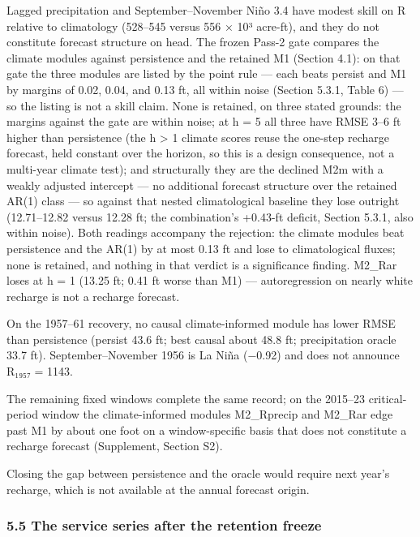 \documentclass[11pt]{article}
\begin{document}
Lagged precipitation and September--November Niño 3.4 have modest skill
on R relative to climatology (528--545 versus 556 × 10³ acre-ft), and
they do not constitute forecast structure on head. The frozen Pass-2
gate compares the climate modules against persistence and the retained
M1 (Section 4.1): on that gate the three modules are listed by the point
rule --- each beats persist and M1 by margins of 0.02, 0.04, and 0.13
ft, all within noise (Section 5.3.1, Table 6) --- so the listing is not
a skill claim. None is retained, on three stated grounds: the margins
against the gate are within noise; at h = 5 all three have RMSE 3--6 ft
higher than persistence (the h \textgreater{} 1 climate scores reuse the
one-step recharge forecast, held constant over the horizon, so this is a
design consequence, not a multi-year climate test); and structurally
they are the declined M2m with a weakly adjusted intercept --- no
additional forecast structure over the retained AR(1) class --- so
against that nested climatological baseline they lose outright
(12.71--12.82 versus 12.28 ft; the combination's +0.43-ft deficit,
Section 5.3.1, also within noise). Both readings accompany the
rejection: the climate modules beat persistence and the AR(1) by at most
0.13 ft and lose to climatological fluxes; none is retained, and nothing
in that verdict is a significance finding. M2\_Rar loses at h = 1 (13.25
ft; 0.41 ft worse than M1) --- autoregression on nearly white recharge
is not a recharge forecast.

On the 1957--61 recovery, no causal climate-informed module has lower
RMSE than persistence (persist 43.6 ft; best causal about 48.8 ft;
precipitation oracle 33.7 ft). September--November 1956 is La Niña
(−0.92) and does not announce R₁₉₅₇ = 1143.

The remaining fixed windows complete the same record; on the 2015--23
critical-period window the climate-informed modules M2\_Rprecip and
M2\_Rar edge past M1 by about one foot on a window-specific basis that
does not constitute a recharge forecast (Supplement, Section S2).

Closing the gap between persistence and the oracle would require next
year's recharge, which is not available at the annual forecast origin.

\subsubsection{5.5 The service series after the retention
freeze}\label{the-service-series-after-the-retention-freeze}
\end{document}
